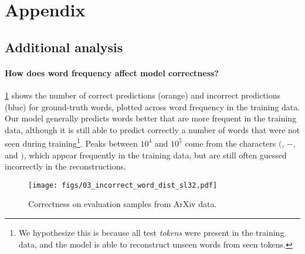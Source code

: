 \documentclass[11pt]{article}
\begin{document}



\appendix

\section{Appendix}
\label{sec:appendix}


\subsection{Additional analysis}



\paragraph{How does word frequency affect model correctness?} \cref{fig:03_incorrect_by_frequency} shows the number of correct predictions (orange) and incorrect predictions (blue) for ground-truth words, plotted across word frequency in the training data. Our model generally predicts words better that are more frequent in the training data, although it is still able to predict correctly a number of words that were not seen during training\footnote{We hypothesize this is because all test \textit{tokens} were present in the training data, and the model is able to reconstruct unseen words from seen tokens.}. Peaks between $10^4$ and $10^5$ come from the characters $($, $-$, and $)$, which appear frequently in the training data, but are still often guessed incorrectly in the reconstructions.

\begin{figure}[t]
    \centering
    \texttt{[image: figs/03\_incorrect\_word\_dist\_sl32.pdf]}
    \caption{Correctness on evaluation samples from ArXiv data.}
    \label{fig:03_incorrect_by_frequency}
\end{figure}
\end{document}
